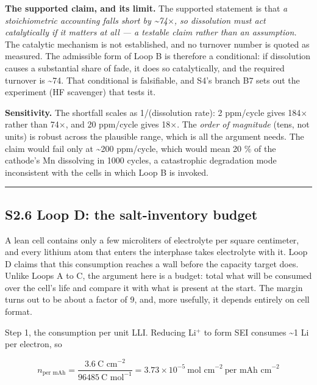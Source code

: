 \documentclass[11pt,a4paper]{article}
\begin{document}
\textbf{The supported claim, and its limit.} The supported statement is that \emph{a stoichiometric accounting falls short by \textasciitilde{}74\ensuremath{\times}, so dissolution must act catalytically if it matters at all --- a testable claim rather than an assumption.} The catalytic mechanism is not established, and no turnover number is quoted as measured. The admissible form of Loop B is therefore a conditional: if dissolution causes a substantial share of fade, it does so catalytically, and the required turnover is \textasciitilde{}74. That conditional is falsifiable, and S4's branch B7 sets out the experiment (HF scavenger) that tests it.


\textbf{Sensitivity.} The shortfall scales as 1/(dissolution rate): 2 ppm/cycle gives 184\ensuremath{\times} rather than 74\ensuremath{\times}, and 20 ppm/cycle gives 18\ensuremath{\times}. The \emph{order of magnitude} (tens, not units) is robust across the plausible range, which is all the argument needs. The claim would fail only at \textasciitilde{}200 ppm/cycle, which would mean 20 \% of the cathode's Mn dissolving in 1000 cycles, a catastrophic degradation mode inconsistent with the cells in which Loop B is invoked.


\par\noindent\rule{\linewidth}{0.4pt}\par


\subsection*{S2.6 Loop D: the salt-inventory budget}


A lean cell contains only a few microliters of electrolyte per square centimeter, and every lithium atom that enters the interphase takes electrolyte with it. Loop D claims that this consumption reaches a wall before the capacity target does. Unlike Loops A to C, the argument here is a budget: total what will be consumed over the cell's life and compare it with what is present at the start. The margin turns out to be about a factor of 9, and, more usefully, it depends entirely on cell format.


Step 1, the consumption per unit LLI. Reducing Li\ensuremath{^{+}} to form SEI consumes \textasciitilde{}1 Li per electron, so


\begin{equation}n_{\text{per mAh}} = \frac{3.6\ \text{C cm}^{-2}}{96485\ \text{C mol}^{-1}} = 3.73\times10^{-5}\ \text{mol cm}^{-2}\ \text{per mAh cm}^{-2} \tag{S2.16}\end{equation}
\end{document}
